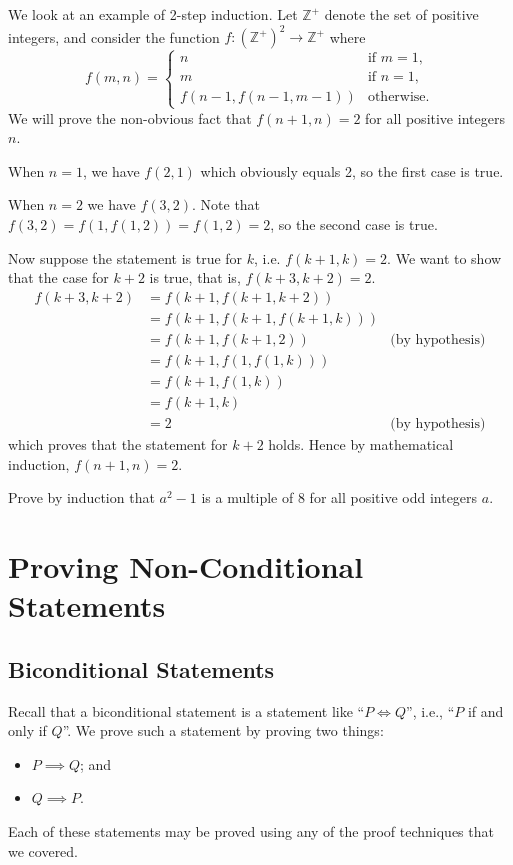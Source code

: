 \begin{example}
    We look at an example of 2-step induction. Let $\mathbb{Z}^+$ denote the set of positive integers, and consider the function $f: \left(\mathbb{Z}^+\right)^2\to\mathbb{Z}^+$ where
    \[
        f(m, n) =
        \begin{cases}
            n & \text{if } m = 1, \\
            m & \text{if } n = 1, \\
            f\left(n-1,f(n-1,m-1)\right) & \text{otherwise.}
        \end{cases}
    \]
    We will prove the non-obvious fact that $f(n+1, n) = 2$ for all positive integers $n$.

    When $n = 1$, we have $f(2, 1)$ which obviously equals 2, so the first case is true.

    When $n = 2$ we have $f(3, 2)$. Note that $f(3,2) = f(1, f(1, 2)) = f(1, 2) = 2$, so the second case is true.

    Now suppose the statement is true for $k$, i.e. $f(k+1,k) = 2$. We want to show that the case for $k+2$ is true, that is, $f(k+3, k+2) = 2$.
    \begin{align*}
        f(k+3, k+2) &= f(k+1, f(k+1, k+2))\\
        &= f(k+1, f(k+1, f(k+1, k)))\\
        &= f(k+1, f(k+1, 2)) & \text{(by hypothesis)}\\
        &= f(k+1, f(1, f(1, k)))\\
        &= f(k+1, f(1, k))\\
        &= f(k+1, k)\\
        &= 2 & \text{(by hypothesis)}
    \end{align*}
    which proves that the statement for $k+2$ holds. Hence by mathematical induction, $f(n+1, n) = 2$.
\end{example}

\begin{exercise}
    Prove by induction that $a^2 - 1$ is a multiple of 8 for all positive odd integers $a$.
\end{exercise}

\section{Proving Non-Conditional Statements}
\subsection{Biconditional Statements}
Recall that a biconditional statement is a statement like ``$P \iff Q$'', i.e., ``$P$ if and only if $Q$''. We prove such a statement by proving two things:
\begin{itemize}
    \item $P \implies Q$; and
    \item $Q \implies P$.
\end{itemize}
Each of these statements may be proved using any of the proof techniques that we covered.

